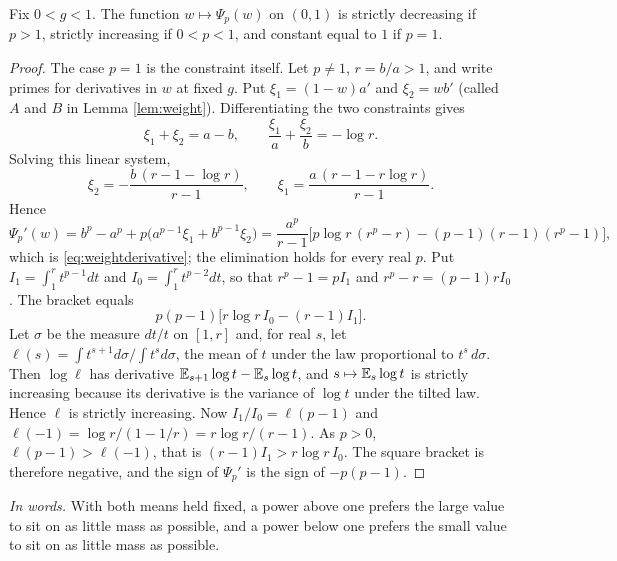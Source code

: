 \begin{lemma}\label{br:lem:weight}
Fix \(0<g<1\). The function \(w\mapsto \Psi_p(w)\) on \((0,1)\) is strictly
decreasing if \(p>1\), strictly increasing if \(0<p<1\), and constant equal
to \(1\) if \(p=1\).
\end{lemma}
\begin{proof}
The case \(p=1\) is the constraint itself. Let \(p\ne1\), \(r=b/a>1\), and
write primes for derivatives in \(w\) at fixed \(g\). Put
\(\xi_1=(1-w)a'\) and \(\xi_2=wb'\) (called \(A\) and \(B\) in Lemma
\ref{lem:weight}). Differentiating the two constraints gives
\[
\xi_1+\xi_2=a-b,\qquad \frac{\xi_1}a+\frac{\xi_2}b=-\log r .
\]
Solving this linear system,
\[
\xi_2=-\frac{b\,(r-1-\log r)}{r-1},\qquad
\xi_1=\frac{a\,(r-1-r\log r)}{r-1}.
\]
Hence
\[
\Psi_p'(w)=b^p-a^p+p\big(a^{p-1}\xi_1+b^{p-1}\xi_2\big)
=\frac{a^p}{r-1}\Big[p\log r\,(r^p-r)-(p-1)(r-1)(r^p-1)\Big],
\]
which is \eqref{eq:weightderivative}; the elimination holds for every real
\(p\). Put \(I_1=\int_1^r t^{p-1}dt\) and \(I_0=\int_1^r t^{p-2}dt\), so that
\(r^p-1=pI_1\) and \(r^p-r=(p-1)rI_0\). The bracket equals
\[
p(p-1)\big[r\log r\,I_0-(r-1)I_1\big].
\]
Let \(\sigma\) be the measure \(dt/t\) on \([1,r]\) and, for real \(s\), let
\(\ell(s)=\int t^{s+1}d\sigma\big/\!\int t^{s}d\sigma\), the mean of \(t\) under the
law proportional to \(t^s\,d\sigma\). Then \(\log\ell\) has derivative
\(\mathbb E_{s+1}\log t-\mathbb E_s\log t\), and \(s\mapsto \mathbb E_s\log t\) is strictly
increasing because its derivative is the variance of \(\log t\) under the
tilted law. Hence \(\ell\) is strictly increasing. Now
\(I_1/I_0=\ell(p-1)\) and \(\ell(-1)=\log r/(1-1/r)=r\log r/(r-1)\). As \(p>0\),
\(\ell(p-1)>\ell(-1)\), that is \((r-1)I_1>r\log r\,I_0\). The square bracket is
therefore negative, and the sign of \(\Psi_p'\) is the sign of \(-p(p-1)\).
\end{proof}

\noindent\textit{In words.} With both means held fixed, a power above one
prefers the large value to sit on as little mass as possible, and a power
below one prefers the small value to sit on as little mass as possible.

